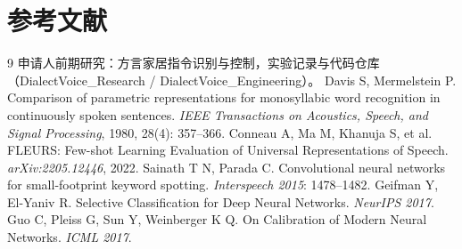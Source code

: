 \documentclass[UTF8,a4paper,12pt,fontset=fandol]{ctexart}
\begin{document}
\section{参考文献}

\begin{thebibliography}{9}
   申请人前期研究：方言家居指令识别与控制，实验记录与代码仓库（DialectVoice\_Research / DialectVoice\_Engineering）。
   Davis S, Mermelstein P. Comparison of parametric representations for monosyllabic word recognition in continuously spoken sentences. \emph{IEEE Transactions on Acoustics, Speech, and Signal Processing}, 1980, 28(4): 357--366.
   Conneau A, Ma M, Khanuja S, et al. FLEURS: Few-shot Learning Evaluation of Universal Representations of Speech. \emph{arXiv:2205.12446}, 2022.
   Sainath T N, Parada C. Convolutional neural networks for small-footprint keyword spotting. \emph{Interspeech 2015}: 1478--1482.
   Geifman Y, El-Yaniv R. Selective Classification for Deep Neural Networks. \emph{NeurIPS 2017}.
   Guo C, Pleiss G, Sun Y, Weinberger K Q. On Calibration of Modern Neural Networks. \emph{ICML 2017}.
\end{thebibliography}
\end{document}

